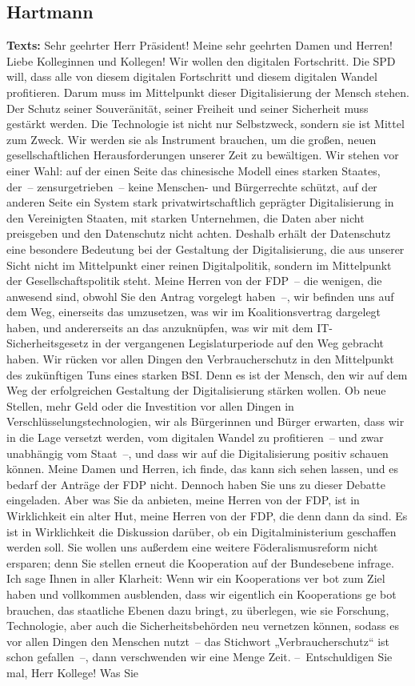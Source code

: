 \documentclass{article}
\begin{document}
\subsection{Hartmann}
\noindent\textbf{Texts:} Sehr geehrter Herr Präsident! Meine sehr geehrten Damen und Herren! Liebe Kolleginnen und Kollegen! Wir wollen den digitalen Fortschritt. Die SPD will, dass alle von diesem digitalen Fortschritt und diesem digitalen Wandel profitieren. Darum muss im Mittelpunkt dieser Digitalisierung der Mensch stehen. Der Schutz seiner Souveränität, seiner Freiheit und seiner Sicherheit muss gestärkt werden. Die Technologie ist nicht nur Selbstzweck, sondern sie ist Mittel zum Zweck. Wir werden sie als Instrument brauchen, um die großen, neuen gesellschaftlichen Herausforderungen unserer Zeit zu bewältigen. Wir stehen vor einer Wahl: auf der einen Seite das chinesische Modell eines starken Staates, der – zensurgetrieben – keine Menschen- und Bürgerrechte schützt, auf der anderen Seite ein System stark privatwirtschaftlich geprägter Digitalisierung in den Vereinigten Staaten, mit starken Unternehmen, die Daten aber nicht preisgeben und den Datenschutz nicht achten.  Deshalb erhält der Datenschutz eine besondere Bedeutung bei der Gestaltung der Digitalisierung, die aus unserer Sicht nicht im Mittelpunkt einer reinen Digitalpolitik, sondern im Mittelpunkt der Gesellschaftspolitik steht. Meine Herren von der FDP – die wenigen, die anwesend sind, obwohl Sie den Antrag vorgelegt haben –, wir befinden uns auf dem Weg, einerseits das umzusetzen, was wir im Koalitionsvertrag dargelegt haben, und andererseits an das anzuknüpfen, was wir mit dem IT-Sicherheitsgesetz in der vergangenen Legislaturperiode auf den Weg gebracht haben. Wir rücken vor allen Dingen den Verbraucherschutz in den Mittelpunkt des zukünftigen Tuns eines starken BSI. Denn es ist der Mensch, den wir auf dem Weg der erfolgreichen Gestaltung der Digitalisierung stärken wollen. Ob neue Stellen, mehr Geld oder die Investition vor allen Dingen in Verschlüsselungstechnologien, wir als Bürgerinnen und Bürger erwarten, dass wir in die Lage versetzt werden, vom digitalen Wandel zu profitieren – und zwar unabhängig vom Staat –, und dass wir auf die Digitalisierung positiv schauen können. Meine Damen und Herren, ich finde, das kann sich sehen lassen, und es bedarf der Anträge der FDP nicht.  Dennoch haben Sie uns zu dieser Debatte eingeladen. Aber was Sie da anbieten, meine Herren von der FDP, ist in Wirklichkeit ein alter Hut, meine Herren von der FDP, die denn dann da sind.  Es ist in Wirklichkeit die Diskussion darüber, ob ein Digitalministerium geschaffen werden soll. Sie wollen uns außerdem eine weitere Föderalismusreform nicht ersparen; denn Sie stellen erneut die Kooperation auf der Bundesebene infrage. Ich sage Ihnen in aller Klarheit: Wenn wir ein Kooperations ver bot zum Ziel haben und vollkommen ausblenden, dass wir eigentlich ein Kooperations ge bot brauchen, das staatliche Ebenen dazu bringt, zu überlegen, wie sie Forschung, Technologie, aber auch die Sicherheitsbehörden neu vernetzen können, sodass es vor allen Dingen den Menschen nutzt – das Stichwort „Verbraucherschutz“ ist schon gefallen –, dann verschwenden wir eine Menge Zeit.  – Entschuldigen Sie mal, Herr Kollege! Was Sie 
\end{document}
